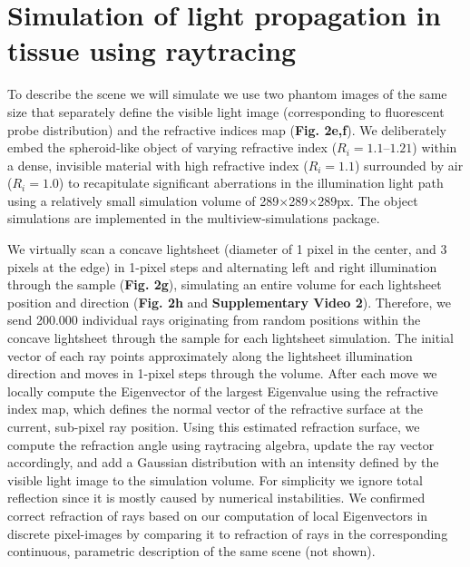 \section{Simulation of light propagation in tissue using raytracing}
\label{sec:raytracing}

To describe the scene we will simulate we use two phantom images of the same size that separately define the visible light image (corresponding to fluorescent probe distribution) and the refractive indices map (\textbf{Fig. 2e,f}). We deliberately embed the spheroid-like object of varying refractive index ($R_i=1.1 – 1.21$) within a dense, invisible material with high refractive index ($R_i=1.1$) surrounded by air ($R_i=1.0$) to recapitulate significant aberrations in the illumination light path using a relatively small simulation volume of 289$\times$289$\times$289px. The object simulations are implemented in the multiview-simulations package\cite{mvdecon}.

We virtually scan a concave lightsheet (diameter of 1 pixel in the center, and 3 pixels at the edge) in 1-pixel steps and alternating left and right illumination through the sample (\textbf{Fig. 2g}), simulating an entire volume for each lightsheet position and direction (\textbf{Fig. 2h} and \textbf{Supplementary Video 2}). Therefore, we send 200.000 individual rays originating from random positions within the concave lightsheet through the sample for each lightsheet simulation. The initial vector of each ray points approximately along the lightsheet illumination direction and moves in 1-pixel steps through the volume. After each move we locally compute the Eigenvector of the largest Eigenvalue using the refractive index map, which defines the normal vector of the refractive surface at the current, sub-pixel ray position. Using this estimated refraction surface, we compute the refraction angle using raytracing algebra\cite{raytracing}, update the ray vector accordingly, and add a Gaussian distribution with an intensity defined by the visible light image to the simulation volume. For simplicity we ignore total reflection since it is mostly caused by numerical instabilities. We confirmed correct refraction of rays based on our computation of local Eigenvectors in discrete pixel-images by comparing it to refraction of rays in the corresponding continuous, parametric description of the same scene (not shown). 

